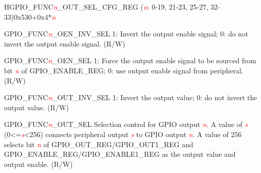 \begin{register}{H}{GPIO\_FUNC\textcolor{red}{\it{n}}\_OUT\_SEL\_CFG\_REG (\textcolor{red}{\it{n}}: 0-19, 21-23, 25-27, 32-33)}{0x530+0x4*\textcolor{red}{\it{n}}}\label{regdesc:GPIOFUNCnOUTSELCFGREG}
%
%
%
%
%
\regnewline%
\begin{regdesc}\begin{reglist}
\item [GPIO\_FUNC\textcolor{red}{\it{n}}\_OEN\_INV\_SEL]1: Invert the output enable signal; 0: do not invert the output enable signal. (R/W)
\label{fielddesc:GPIOFUNCNOENSEL} \item [GPIO\_FUNC\textcolor{red}{\it{n}}\_OEN\_SEL]1: Force the output enable signal to be sourced from bit \textcolor{red}{\textit{n}} of GPIO\_ENABLE\_REG; 0: use output enable signal from peripheral. (R/W)
\item [GPIO\_FUNC\textcolor{red}{\it{n}}\_OUT\_INV\_SEL]1: Invert the output value; 0: do not invert the output value. (R/W)
\item [GPIO\_FUNC\textcolor{red}{\it{n}}\_OUT\_SEL]Selection control for GPIO output \textcolor{red}{\textit{n}}. A value of \textcolor{red}{\it{s}} (0<=\textcolor{red}{\it{s}}<256) connects peripheral output \textcolor{red}{\it{s}} to GPIO output \textcolor{red}{\textit{n}}. A value of 256 selects bit \textcolor{red}{\textit{n}} of GPIO\_OUT\_REG/GPIO\_OUT1\_REG and GPIO\_ENABLE\_REG/GPIO\_ENABLE1\_REG as the output value and output enable. (R/W)
\end{reglist}\end{regdesc}
\end{register}
